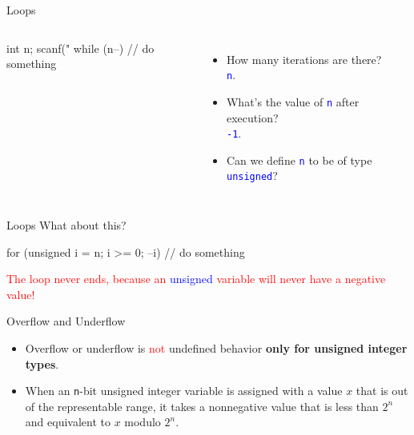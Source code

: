 \documentclass[handout]{beamer}
\newcommand{\red}[1]{\textcolor{red}{#1}}
\newcommand{\blue}[1]{\textcolor{blue}{#1}}
\newcommand{\ttt}[1]{\texttt{#1}}
\newcommand{\bluett}[1]{\blue{\ttt{#1}}}
\begin{document}
\begin{frame}[fragile]{Loops}
    \begin{columns}
        \begin{cpp}
int n;
scanf("%
while (n--) {
  // do something
}
        \end{cpp}
        \begin{itemize}
            \item How many iterations are there?\\
            \pause
            \bluett{n}.
            \pause
            \item What's the value of \bluett{n} after execution?\\
            \pause
            \bluett{-1}.
            \pause
            \item Can we define \bluett{n} to be of type \bluett{unsigned}?
        \end{itemize}
    \end{columns}
\end{frame}

\begin{frame}[fragile]{Loops}
    What about this?
    \begin{cpp}
for (unsigned i = n; i >= 0; --i) {
  // do something
}
    \end{cpp}
    \pause
    \red{The loop never ends, because an }\blue{unsigned }\red{variable will never have a negative value!}
\end{frame}

\begin{frame}{Overflow and Underflow}
    \begin{itemize}
        \item Overflow or underflow is \red{not} undefined behavior \textbf{only for unsigned integer types}.
        \item When an \ttt{n}-bit unsigned integer variable is assigned with a value \(x\) that is out of the representable range, it takes a nonnegative value that is less than \(2^n\) and equivalent to \(x\) modulo \(2^n\).
    \end{itemize}
\end{frame}
\end{document}
